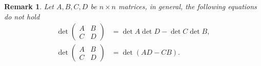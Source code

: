 \documentclass[11pt]{book}
\newtheorem{remark}{Remark}[chapter]
\theoremstyle{definition}
\numberwithin{equation}{chapter}
\begin{document}
\begin{remark}
Let $A,B,C,D$ be $n\times n$ matrices, in general, the following equations do not hold
\begin{align*}
    \det \left(
    \begin{matrix}
        A & B\\
        C & D
    \end{matrix}
    \right) & = \det A \det D - \det C \det B, \\
    \det \left(
    \begin{matrix}
        A & B\\
        C & D
    \end{matrix}
    \right)& = \det(AD - CB).
\end{align*}
\end{remark}

\medskip
\end{document}
